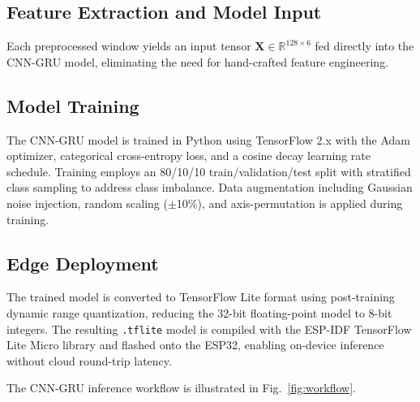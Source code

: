 \documentclass[conference]{IEEEtran}
\begin{document}
\subsection{Feature Extraction and Model Input}

Each preprocessed window yields an input tensor $\mathbf{X} \in \mathbb{R}^{128 \times 6}$ fed directly into the CNN-GRU model, eliminating the need for hand-crafted feature engineering.

\subsection{Model Training}

The CNN-GRU model is trained in Python using TensorFlow 2.x with the Adam optimizer, categorical cross-entropy loss, and a cosine decay learning rate schedule. Training employs an 80/10/10 train/validation/test split with stratified class sampling to address class imbalance. Data augmentation including Gaussian noise injection, random scaling ($\pm$10\%), and axis-permutation is applied during training.

\subsection{Edge Deployment}

The trained model is converted to TensorFlow Lite format using post-training dynamic range quantization, reducing the 32-bit floating-point model to 8-bit integers. The resulting \texttt{.tflite} model is compiled with the ESP-IDF TensorFlow Lite Micro library and flashed onto the ESP32, enabling on-device inference without cloud round-trip latency.

The CNN-GRU inference workflow is illustrated in Fig.~\ref{fig:workflow}.
\end{document}
